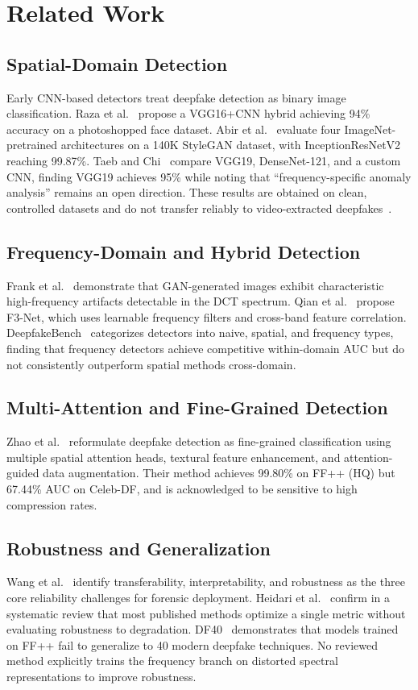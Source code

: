 \documentclass[conference]{IEEEtran}
\begin{document}
\section{Related Work}

\subsection{Spatial-Domain Detection}
Early CNN-based detectors treat deepfake detection as binary image
classification. Raza et al.~\cite{raza2022novel} propose a VGG16+CNN
hybrid achieving 94\% accuracy on a photoshopped face dataset.
Abir et al.~\cite{abir2023detecting} evaluate four ImageNet-pretrained
architectures on a 140K StyleGAN dataset, with InceptionResNetV2
reaching 99.87\%. Taeb and Chi~\cite{taeb2022comparison} compare
VGG19, DenseNet-121, and a custom CNN, finding VGG19 achieves 95\%
while noting that ``frequency-specific anomaly analysis'' remains an
open direction. These results are obtained on clean, controlled
datasets and do not transfer reliably to video-extracted
deepfakes~\cite{yan2023deepfakebench}.

\subsection{Frequency-Domain and Hybrid Detection}
Frank et al.~\cite{frank2020leveraging} demonstrate that GAN-generated
images exhibit characteristic high-frequency artifacts detectable in
the DCT spectrum. Qian et al.~\cite{qian2020thinking} propose F3-Net,
which uses learnable frequency filters and cross-band feature
correlation. DeepfakeBench~\cite{yan2023deepfakebench} categorizes
detectors into naive, spatial, and frequency types, finding that
frequency detectors achieve competitive within-domain AUC but do not
consistently outperform spatial methods cross-domain.

\subsection{Multi-Attention and Fine-Grained Detection}
Zhao et al.~\cite{zhao2021multiattentional} reformulate deepfake
detection as fine-grained classification using multiple spatial
attention heads, textural feature enhancement, and attention-guided
data augmentation. Their method achieves 99.80\% on FF++ (HQ) but
67.44\% AUC on Celeb-DF, and is acknowledged to be sensitive to high
compression rates.

\subsection{Robustness and Generalization}
Wang et al.~\cite{wang2024survey} identify transferability,
interpretability, and robustness as the three core reliability
challenges for forensic deployment. Heidari
et al.~\cite{heidari2024systematic} confirm in a systematic review
that most published methods optimize a single metric without evaluating
robustness to degradation. DF40~\cite{yan2024df40} demonstrates that
models trained on FF++ fail to generalize to 40 modern deepfake
techniques. No reviewed method explicitly trains the frequency branch
on distorted spectral representations to improve robustness.
\end{document}
